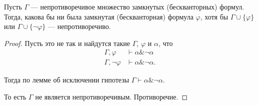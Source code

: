 \begin{theorem}
    Пусть $\Gamma$ --- непротиворечивое множество замкнутых (бескванторных) формул. Тогда, какова бы ни была
замкнутая (бескванторная) формула $\varphi$, хотя бы $\Gamma \cup \{\varphi\}$ или $\Gamma \cup \{\neg\varphi\}$ ---
непротиворечиво.
\end{theorem}
\begin{proof}
    Пусть это не так и найдутся такие $\Gamma$, $\varphi$ и $\alpha$, что
 \[ \begin{array}{rl}\Gamma,\varphi & \vdash \alpha\&\neg\alpha\\
\Gamma,\neg\varphi & \vdash \alpha \&\neg\alpha. \end{array}\]

Тогда по лемме об исключении гипотезы $ \Gamma\vdash \alpha\&\neg\alpha. $

То есть $\Gamma$ не является непротиворечивым. Противоречие.
\end{proof}

